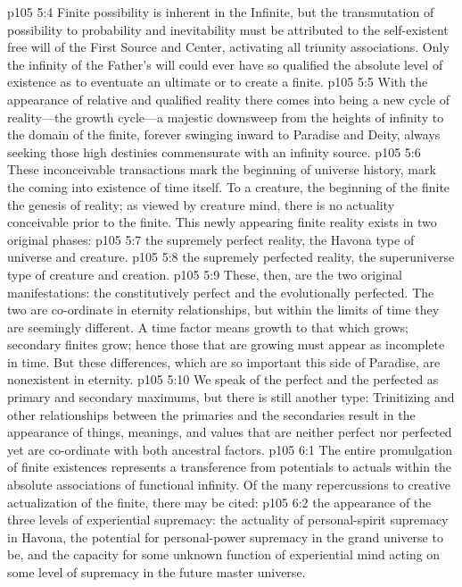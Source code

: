 \pc \vs p105 5:4 Finite possibility is inherent in the Infinite, but the transmutation of possibility to probability and inevitability must be attributed to the self\hyp{}existent free will of the First Source and Center, activating all triunity associations. Only the infinity of the Father’s will could ever have so qualified the absolute level of existence as to eventuate an ultimate or to create a finite.
\vs p105 5:5 With the appearance of relative and qualified reality there comes into being a new cycle of reality---the growth cycle---a majestic downsweep from the heights of infinity to the domain of the finite, forever swinging inward to Paradise and Deity, always seeking those high destinies commensurate with an infinity source.
\vs p105 5:6 These inconceivable transactions mark the beginning of universe history, mark the coming into existence of time itself. To a creature, the beginning of the finite  the genesis of reality; as viewed by creature mind, there is no actuality conceivable prior to the finite. This newly appearing finite reality exists in two original phases:
\pc \vs p105 5:7 \bibnobreakspace {} the supremely perfect reality, the Havona type of universe and creature.
\vs p105 5:8 \bibnobreakspace {} the supremely perfected reality, the superuniverse type of creature and creation.
\pc \vs p105 5:9 These, then, are the two original manifestations: the constitutively perfect and the evolutionally perfected. The two are co\hyp{}ordinate in eternity relationships, but within the limits of time they are seemingly different. A time factor means growth to that which grows; secondary finites grow; hence those that are growing must appear as incomplete in time. But these differences, which are so important this side of Paradise, are nonexistent in eternity.
\vs p105 5:10 We speak of the perfect and the perfected as primary and secondary maximums, but there is still another type: Trinitizing and other relationships between the primaries and the secondaries result in the appearance of things, meanings, and values that are neither perfect nor perfected yet are co\hyp{}ordinate with both ancestral factors.
\vs p105 6:1 The entire promulgation of finite existences represents a transference from potentials to actuals within the absolute associations of functional infinity. Of the many repercussions to creative actualization of the finite, there may be cited:
\pc \vs p105 6:2 \bibnobreakspace {} the appearance of the three levels of experiential supremacy: the actuality of personal\hyp{}spirit supremacy in Havona, the potential for personal\hyp{}power supremacy in the grand universe to be, and the capacity for some unknown function of experiential mind acting on some level of supremacy in the future master universe.
